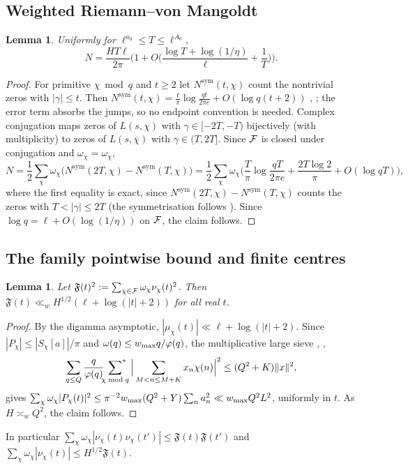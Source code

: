 \documentclass[11pt]{amsart}
\newtheorem{lemma}[theorem]{Lemma}
\theoremstyle{definition}
\theoremstyle{remark}
\numberwithin{equation}{section}
\begin{document}
\subsection{Weighted Riemann--von Mangoldt}
\begin{lemma}\label{lem:RvM}
Uniformly for $\ell^{a_0}\le T\le\ell^{A_0}$,
\[
N=\frac{HT\ell}{2\pi}\Big(1+O\Big(\frac{\log T+\log(1/\eta)}{\ell}+\frac1T\Big)\Big).
\]
\end{lemma}
\begin{proof}
For primitive $\chi\bmod q$ and $t\ge2$ let $N^{\mathrm{sym}}(t,\chi)$ count the nontrivial zeros with $|\gamma|\le t$. Then $N^{\mathrm{sym}}(t,\chi)=\frac t\pi\log\frac{qt}{2\pi e}+O(\log q(t+2))$ \cite[Ch.~16]{Dav}, \cite[Thm.~1.1]{BMOR21}; the error term absorbs the jumps, so no endpoint convention is needed. Complex conjugation maps zeros of $L(s,\chi)$ with $\gamma\in[-2T,-T)$ bijectively (with multiplicity) to zeros of $L(s,\overline\chi)$ with $\gamma\in(T,2T]$. Since $\mathcal F$ is closed under conjugation and $\omega_{\overline\chi}=\omega_\chi$,
\[
N=\frac12\sum_\chi\omega_\chi\big(N^{\mathrm{sym}}(2T,\chi)-N^{\mathrm{sym}}(T,\chi)\big)=\frac12\sum_\chi\omega_\chi\Big(\frac T\pi\log\frac{qT}{2\pi e}+\frac{2T\log2}\pi+O(\log qT)\Big),
\]
where the first equality is exact, since $N^{\mathrm{sym}}(2T,\chi)-N^{\mathrm{sym}}(T,\chi)$ counts the zeros with $T<|\gamma|\le2T$ (the symmetrisation follows \cite[Lemmas~3.1,~3.2]{HY26}). Since $\log q=\ell+O(\log(1/\eta))$ on $\mathcal F$, the claim follows.
\end{proof}

\subsection{The family pointwise bound and finite centres}\label{sec:finitecentre}
\begin{lemma}\label{lem:pointwise}
Let $\mathfrak F(t)^2:=\sum_{\chi\in\mathcal F}\omega_\chi\nu_\chi(t)^2$. Then $\mathfrak F(t)\ll_wH^{1/2}(\ell+\log(|t|+2))$ for all real $t$.
\end{lemma}
\begin{proof}
By the digamma asymptotic, $|\mu_\chi(t)|\ll\ell+\log(|t|+2)$. Since $|P_\chi|\le|S_\chi[a]|/\pi$ and $\omega(q)\le w_{\max} q/\varphi(q)$, the multiplicative large sieve \cite{MV73}, \cite[Thm.~7.13]{IK04},
\begin{equation}\label{eq:MVLS}
\sum_{q\le Q}\frac q{\varphi(q)}\sideset{}{^{*}}\sum_{\chi\bmod q}\Big|\sum_{M<n\le M+K}x_n\chi(n)\Big|^2\le(Q^2+K)\|x\|^2,
\end{equation}
gives $\sum_\chi\omega_\chi|P_\chi(t)|^2\le\pi^{-2}w_{\max}(Q^2+Y)\sum_na_n^2\ll w_{\max} Q^2L^2$, uniformly in $t$. As $H\asymp_wQ^2$, the claim follows.
\end{proof}
In particular $\sum_\chi\omega_\chi|\nu_\chi(t)\nu_\chi(t')|\le\mathfrak F(t)\mathfrak F(t')$ and $\sum_\chi\omega_\chi|\nu_\chi(t)|\le H^{1/2}\mathfrak F(t)$.
\end{document}
